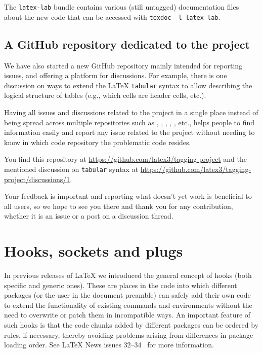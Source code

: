 \documentclass{ltnews}
\providecommand\env[1]{\texttt{#1}}
\providecommand\env[1]{\texttt{#1}}
\let\finalpagebreak\pagebreak %
\begin{document}
The \texttt{latex-lab} bundle contains various (still untagged)
documentation files about the new code that can be accessed with
\verb|texdoc -l latex-lab|.

\subsection{A GitHub repository dedicated to the project}

We have also started a new GitHub repository mainly intended for
reporting issues, and offering a platform for discussions. For
example, there is one discussion on ways to extend the \LaTeX{}
\env{tabular} syntax to allow describing the logical structure of
tables (e.g., which cells are header cells, etc.).

Having all issues and discussions related to the project in a single
place instead of being spread across multiple repositories such as
, , , ,
, etc., helps people to find information easily
and report any issue related to the project without needing to know in which
code repository the problematic code resides.

You find this repository at
\url{https://github.com/latex3/tagging-project} and the mentioned
discussion on \env{tabular} syntax at
\url{https://github.com/latex3/tagging-project/discussions/1}.

Your feedback is important and reporting what doesn't yet work is
beneficial to all users, so we hope to see you there and thank you for
any contribution, whether it is an issue or a post on a discussion
thread.


\section{Hooks, sockets and plugs}

In previous releases of \LaTeX{} we introduced the general concept of
hooks (both specific and generic ones). These are places in the
code into which different packages (or the user in the document
preamble) can safely add their own code to extend the functionality of
existing commands and environments without the need to overwrite or
patch them in incompatible ways. An important feature of such hooks is
that the code chunks added by different packages can be ordered by
rules, if necessary,
\finalpagebreak
thereby avoiding problems arising from
differences in package loading order. See \LaTeX{} News issues
32--34~\cite{38:ltnews} for more information.
\end{document}
